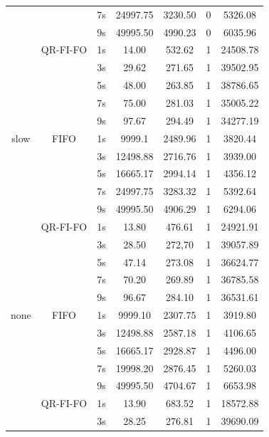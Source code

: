 \begin{center}
\begin{longtable}{|c||c||c|c|c|c|c|}
			   &      & 7s & 24997.75 & 3230.50 & 0 & 5326.08 \\ \cline{3-7}
			   &      & 9s & 49995.50 & 4990.23 & 0 & 6035.96 \\ \cline{2-7}
			   & QR-FI-FO & 1s & 14.00 & 532.62 & 1 & 24508.78 \\ \cline{3-7}
			   &		  & 3s & 29.62 & 271.65 & 1 & 39502.95 \\ \cline{3-7}
			   &          & 5s & 48.00 & 263.85 & 1 & 38786.65 \\ \cline{3-7}
			   &          & 7s & 75.00 & 281.03 & 1 & 35005.22 \\ \cline{3-7}
			   &          & 9s & 97.67 & 294.49 & 1 & 34277.19 \\ \hhline{|=#=#=|=|=|=|=|}
        slow  & FIFO & 1s & 9999.1 & 2489.96 & 1 & 3820.44 \\ \cline{3-7}
			  &	     & 3s & 12498.88 & 2716.76 & 1& 3939.00 \\ \cline{3-7}
			  &      & 5s & 16665.17 & 2994.14 & 1& 4356.12 \\ \cline{3-7}
			  &      & 7s & 24997.75 & 3283.32 & 1& 5392.64 \\ \cline{3-7}
			  &      & 9s & 49995.50 & 4906.29 & 1& 6294.06 \\ \cline{2-7}
			  & QR-FI-FO & 1s & 13.80 & 476.61 & 1 & 24921.91 \\ \cline{3-7}
			  &		     & 3s & 28.50 & 272,70 & 1 & 39057.89 \\ \cline{3-7}
			  &          & 5s & 47.14 & 273.08 & 1 & 36624.77 \\ \cline{3-7}
			  &          & 7s & 70.20 & 269.89 & 1 & 36785.58 \\ \cline{3-7}
			  &          & 9s & 96.67 & 284.10 & 1 & 36531.61 \\ \hhline{|=#=#=|=|=|=|=|}
        none   & FIFO & 1s & 9999.10 & 2307.75 & 1 & 3919.80 \\ \cline{3-7}
			   &	  & 3s & 12498.88 & 2587.18 & 1 & 4106.65 \\ \cline{3-7}
			   &      & 5s & 16665.17 & 2928.87 & 1 & 4496.00 \\ \cline{3-7}
			   &      & 7s & 19998.20 & 2876.45 & 1 & 5260.03 \\ \cline{3-7}
			   &      & 9s & 49995.50 & 4704.67 & 1 & 6653.98 \\ \cline{2-7}
			   & QR-FI-FO & 1s & 13.90 & 683.52 & 1 & 18572.88\\ \cline{3-7}
			   &		  & 3s & 28.25 & 276.81 & 1 & 39690.09\\ \cline{3-7}

\end{longtable}
\end{center}
